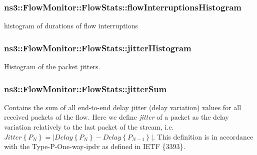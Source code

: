 \subsubsection[{\texorpdfstring{flow\+Interruptions\+Histogram}{flowInterruptionsHistogram}}]{ ns3\+::\+Flow\+Monitor\+::\+Flow\+Stats\+::flow\+Interruptions\+Histogram}\hypertarget{structns3_1_1FlowMonitor_1_1FlowStats_a9756977b7eaf7397f727f34c3ad9705a}{}\label{structns3_1_1FlowMonitor_1_1FlowStats_a9756977b7eaf7397f727f34c3ad9705a}


histogram of durations of flow interruptions 

\subsubsection[{\texorpdfstring{jitter\+Histogram}{jitterHistogram}}]{ ns3\+::\+Flow\+Monitor\+::\+Flow\+Stats\+::jitter\+Histogram}\hypertarget{structns3_1_1FlowMonitor_1_1FlowStats_a7fb3f521d5b8c3a4c8ce020cb5ee762d}{}\label{structns3_1_1FlowMonitor_1_1FlowStats_a7fb3f521d5b8c3a4c8ce020cb5ee762d}


\hyperlink{classns3_1_1Histogram}{Histogram} of the packet jitters. 

\subsubsection[{\texorpdfstring{jitter\+Sum}{jitterSum}}]{ ns3\+::\+Flow\+Monitor\+::\+Flow\+Stats\+::jitter\+Sum}\hypertarget{structns3_1_1FlowMonitor_1_1FlowStats_ae9624614aa39fc4c53dbbf6f8030040c}{}\label{structns3_1_1FlowMonitor_1_1FlowStats_ae9624614aa39fc4c53dbbf6f8030040c}
Contains the sum of all end-\/to-\/end delay jitter (delay variation) values for all received packets of the flow. Here we define {\itshape jitter} of a packet as the delay variation relatively to the last packet of the stream, i.\+e. $Jitter\left\{P_N\right\} = \left|Delay\left\{P_N\right\} - Delay\left\{P_{N-1}\right\}\right|$. This definition is in accordance with the Type-\/\+P-\/\+One-\/way-\/ipdv as defined in I\+E\+TF \{3393\}. 
